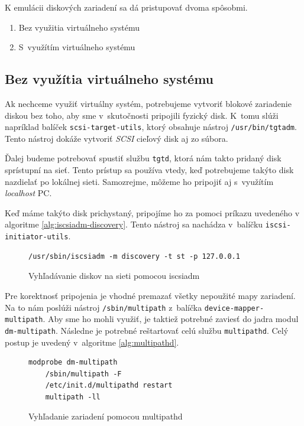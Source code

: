 K emulácii diskových zariadení sa dá pristupovať dvoma spôsobmi. 

\begin{enumerate}
    \item Bez využitia virtuálneho systému \label{item:without-virt-system}
    \item S~využítím virtuálneho systému \label{item:with-virt-system}
\end{enumerate}

%
%

\subsection{Bez využítia virtuálneho systému}

Ak nechceme využiť virtuálny systém, potrebujeme vytvoriť blokové zariadenie
diskou bez toho, aby sme v~skutočnosti pripojili fyzický disk. K~tomu slúži
napríklad balíček \texttt{scsi-target-utils}, ktorý obsahuje nástroj
\texttt{/usr/bin/tgtadm}.  Tento nástroj dokáže vytvoriť \emph{SCSI} cieľový
disk aj zo súbora. 

Ďalej budeme potrebovať spustiť službu \texttt{tgtd}, ktorá nám takto pridaný
disk sprístupní na sieť. Tento prístup sa používa vtedy, keď potrebujeme takýto
disk nazdielať po lokálnej sieti. Samozrejme, môžeme ho pripojiť aj s~využítím
\emph{localhost} PC.

Keď máme takýto disk prichystaný, pripojíme ho za pomoci príkazu uvedeného v
algoritme \ref{alg:iscsiadm-discovery}. Tento nástroj sa nachádza v~balíčku
\texttt{iscsi-initiator-utils}.

\begin{figure}[H]
\begin{lstlisting}[label=alg:iscsiadm-discovery]
    /usr/sbin/iscsiadm -m discovery -t st -p 127.0.0.1
\end{lstlisting}
\caption{Vyhľadávanie diskov na sieti pomocou iscsiadm}
\end{figure}

Pre korektnosť pripojenia je vhodné premazať všetky nepoužité mapy zariadení.
Na to nám poslúži nástroj \texttt{/sbin/multipath} z~balíčka
\texttt{device-mapper-multipath}. Aby sme ho mohli využiť, je taktiež potrebné
zaviesť do jadra modul \texttt{dm-multipath}. Následne je potrebné reštartovať celú
službu \texttt{multipathd}. Celý postup je uvedený v~algoritme
\ref{alg:multipathd}.

\begin{figure}[H]
\begin{lstlisting}[label=alg:multipathd]
    modprobe dm-multipath
    /sbin/multipath -F
    /etc/init.d/multipathd restart
    multipath -ll
\end{lstlisting}
\caption{Vyhľadanie zariadení pomocou multipathd}
\end{figure}

